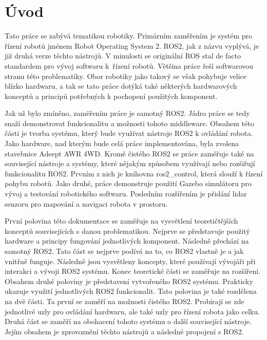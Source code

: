 
%

\chapter{Úvod}
Tato práce se zabývá tematikou robotiky. Primárním zaměřením je systém pro řízení robotů jménem Robot Operating System 2. ROS2, jak z názvu vyplývá, je již druhá verze těchto nástrojů. V minulosti se originální ROS stal de facto standardem pro vývoj softwaru k~řízení robotů. Většina práce řeší softwarovou stranu této problematiky. Obor robotiky jako takový se však pohybuje velice blízko hardwaru, a tak se tato práce dotýká také některých hardwarových konceptů a principů potřebných k pochopení použitých komponent.

Jak už bylo zmíněno, zaměřením práce je samotný ROS2. Jádro práce se tedy snaží demonstrovat funkcionalitu a možnosti tohoto middleware. Obsahem této části je tvorba systému, který bude využívat nástroje ROS2 k ovládání robota. Jako hardware, nad kterým bude celá práce implementována, byla zvolena stavebnice Adeept AWR 4WD. Kromě čistého ROS2 se práce zaměřuje také na související nástroje a systémy, které nějakým způsobem využívají nebo rozšiřují funkcionalitu ROS2. Prvním z nich je knihovna ros2\_control, která slouží k řízení pohybu robotů. Jako druhé, práce demonstruje použití Gazebo simulátoru pro vývoj a testování robotického softwaru. Posledním rozšířením je přidání lidar senzoru pro mapování a navigaci robota v prostoru.

První polovina této dokumentace se zaměřuje na vysvětlení teoretičtějších konceptů souvisejících s danou problematikou. Nejprve se představuje použitý hardware a principy fungování jednotlivých komponent. Následně přechází na samotný ROS2. Tato část se nejprve podívá na to, co ROS2 vlastně je a jak vnitřně funguje. Následně jsou vysvětleny koncepty, které používají vývojáři při interakci a vývoji ROS2 systému. Konec teoretické části se zaměřuje na rozšíření.
Obsahem druhé poloviny je představení vytvořeného ROS2 systému. Prakticky ukazuje využití jednotlivých ROS2 funkcionalit. Tato polovina je také rozdělena na dvě části. Ta první se zaměří na možnosti čistého ROS2. Probírají se zde jednotlivé uzly pro ovládání hardwaru, ale také uzly pro řízení robota jako celku. Druhá část se zaměří na obohacení tohoto systému o další související nástroje. Jejím obsahem je zprovoznění těchto nástrojů a následné propojení s ROS2.

